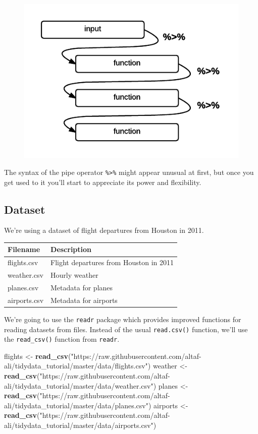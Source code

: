 \documentclass[]{article}
\newenvironment{Shaded}{\begin{snugshade}}{\end{snugshade}}
\newcommand{\KeywordTok}[1]{\textcolor[rgb]{0.13,0.29,0.53}{\textbf{{#1}}}}
\newcommand{\StringTok}[1]{\textcolor[rgb]{0.31,0.60,0.02}{{#1}}}
\newcommand{\NormalTok}[1]{{#1}}
\theoremstyle{definition}
\theoremstyle{definition}
\theoremstyle{definition}
\theoremstyle{remark}
\begin{document}
\begin{figure}[htbp]
\centering
\includegraphics{./img/pipes.png}
\caption{}
\end{figure}

The syntax of the pipe operator \texttt{\%\textgreater{}\%} might appear
unusual at first, but once you get used to it you'll start to appreciate
its power and flexibility.

\subsection{Dataset}\label{dataset}

We're using a dataset of flight departures from Houston in 2011.

\begin{longtable}[c]{@{}ll@{}}
\toprule
Filename & Description\tabularnewline
\midrule
\endhead
flights.csv & Flight departures from Houston in 2011\tabularnewline
weather.csv & Hourly weather\tabularnewline
planes.csv & Metadata for planes\tabularnewline
airports.csv & Metadata for airports\tabularnewline
\bottomrule
\end{longtable}

We're going to use the \texttt{readr} package which provides improved
functions for reading datasets from files. Instead of the usual
\texttt{read.csv()} function, we'll use the \texttt{read\_csv()}
function from \texttt{readr}.

\begin{Shaded}
\begin{Highlighting}[]
\NormalTok{flights <-}\StringTok{ }\KeywordTok{read_csv}\NormalTok{(}\StringTok{"https://raw.githubusercontent.com/altaf-ali/tidydata_tutorial/master/data/flights.csv"}\NormalTok{)}
\NormalTok{weather <-}\StringTok{ }\KeywordTok{read_csv}\NormalTok{(}\StringTok{"https://raw.githubusercontent.com/altaf-ali/tidydata_tutorial/master/data/weather.csv"}\NormalTok{)}
\NormalTok{planes <-}\StringTok{ }\KeywordTok{read_csv}\NormalTok{(}\StringTok{"https://raw.githubusercontent.com/altaf-ali/tidydata_tutorial/master/data/planes.csv"}\NormalTok{)}
\NormalTok{airports <-}\StringTok{ }\KeywordTok{read_csv}\NormalTok{(}\StringTok{"https://raw.githubusercontent.com/altaf-ali/tidydata_tutorial/master/data/airports.csv"}\NormalTok{)}
\end{Highlighting}
\end{Shaded}
\end{document}
